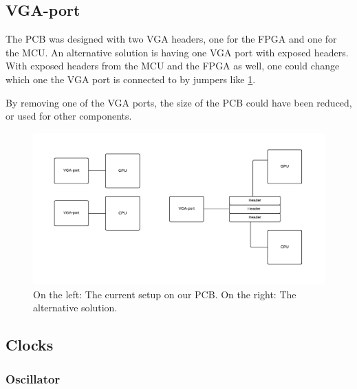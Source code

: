 \documentclass[../main/report.tex]{subfiles}
\begin{document}
\subsection*{VGA-port}
The PCB was designed with two VGA headers, one for the FPGA and one for the MCU.
An alternative solution is having one VGA port with exposed headers.
With exposed headers from the MCU and the FPGA as well, one could change which one the VGA port is connected to by jumpers like \ref{fig:vga-solution}.

By removing one of the VGA ports, the size of the PCB could have been reduced, or used for other components. 

\begin{figure}[H]
    \centering
    \includegraphics[width=\textwidth]{../discussion/assets/vga-solution.pdf}
    \caption{On the left: The current setup on our PCB. On the right: The alternative solution.}
    \label{fig:vga-solution}
\end{figure}

\subsection{Clocks}

\subsubsection*{Oscillator}
\end{document}
